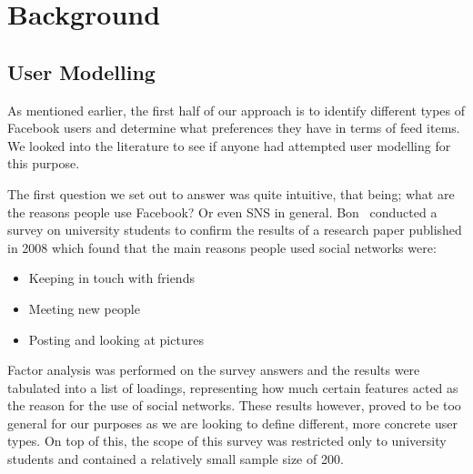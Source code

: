 \chapter{Background}\label{ch:background}


\section{User Modelling}

As mentioned earlier, the first half of our approach is to identify different types of Facebook users and determine what preferences they have in terms of feed items. We looked into the literature to see if anyone had attempted user modelling for this purpose.

The first question we set out to answer was quite intuitive, that being; what are the reasons people use Facebook? Or even SNS in general. Bon~\cite{bonds2010myspace} conducted a survey on university students to confirm the results of a research paper published in 2008 which found that the main reasons people used social networks were:

\begin{itemize}
\item Keeping in touch with friends
\item Meeting new people
\item Posting and looking at pictures
\end{itemize}

Factor analysis was performed on the survey answers and the results were tabulated into a list of loadings, representing how much certain features acted as the reason for the use of social networks. These results however, proved to be too general for our purposes as we are looking to define different, more concrete user types. On top of this, the scope of this survey was restricted only to university students and contained a relatively small sample size of 200.

